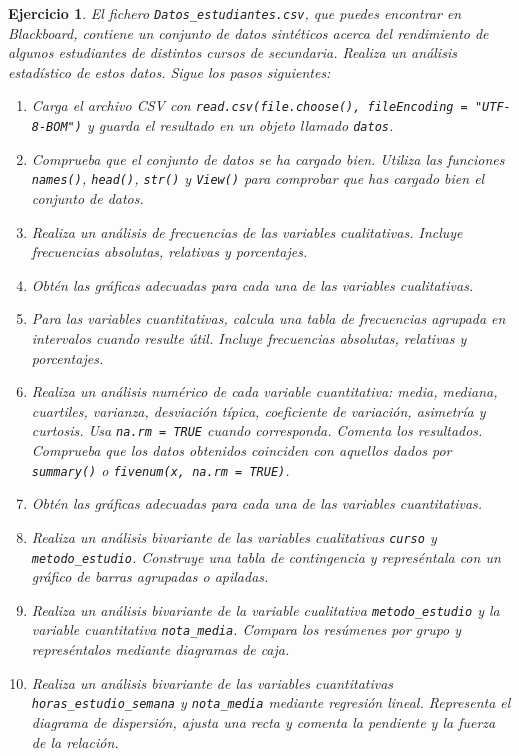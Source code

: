 \documentclass[11pt,a4paper]{article}
\theoremstyle{exercise}
\newtheorem{exercise}{Ejercicio}
\begin{document}
\begin{exercise} El fichero \texttt{Datos\_estudiantes.csv}, que puedes encontrar en Blackboard, contiene un conjunto de datos sintéticos acerca del rendimiento de algunos estudiantes de distintos cursos de secundaria. Realiza un análisis estadístico de estos datos. Sigue los pasos siguientes:
\begin{enumerate}
	\item Carga el archivo CSV con \verb|read.csv(file.choose(), fileEncoding = "UTF-8-BOM")| y guarda el resultado en un objeto llamado \texttt{datos}.

	\item Comprueba que el conjunto de datos se ha cargado bien. Utiliza las funciones \texttt{names()}, \texttt{head()}, \texttt{str()} y \texttt{View()} para comprobar que has cargado bien el conjunto de datos.

	\item Realiza un análisis de frecuencias de las variables cualitativas. Incluye frecuencias absolutas, relativas y porcentajes.

	\item Obtén las gráficas adecuadas para cada una de las variables cualitativas. 

	\item Para las variables cuantitativas, calcula una tabla de frecuencias agrupada en intervalos cuando resulte útil. Incluye frecuencias absolutas, relativas y porcentajes.

	\item Realiza un análisis numérico de cada variable cuantitativa: media, mediana, cuartiles, varianza, desviación típica, coeficiente de variación, asimetría y curtosis. Usa \texttt{na.rm = TRUE} cuando corresponda. Comenta los resultados. Comprueba que los datos obtenidos coinciden con aquellos dados por \texttt{summary()} o \texttt{fivenum(x, na.rm = TRUE)}.

	\item Obtén las gráficas adecuadas para cada una de las variables cuantitativas.

	\item Realiza un análisis bivariante de las variables cualitativas \texttt{curso} y \texttt{metodo\_estudio}. Construye una tabla de contingencia y represéntala con un gráfico de barras agrupadas o apiladas.

	\item Realiza un análisis bivariante de la variable cualitativa \texttt{metodo\_estudio} y la variable cuantitativa \texttt{nota\_media}. Compara los resúmenes por grupo y represéntalos mediante diagramas de caja.

	\item Realiza un análisis bivariante de las variables cuantitativas \texttt{horas\_estudio\_semana} y \texttt{nota\_media} mediante regresión lineal. Representa el diagrama de dispersión, ajusta una recta y comenta la pendiente y la fuerza de la relación.
	\end{enumerate}
\end{exercise}
\end{document}
